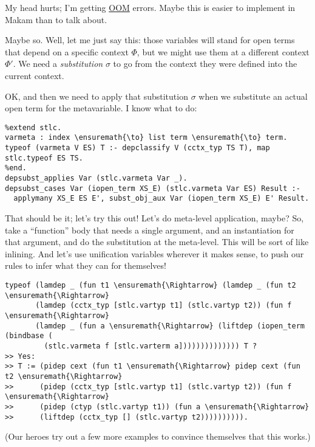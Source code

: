 \heroSTUDENT{} My head hurts; I'm getting
\href{https://en.wikipedia.org/wiki/Out_of_memory}{OOM} errors. Maybe
this is easier to implement in Makam than to talk about.

\heroADVISOR{} Maybe so. Well, let me just say this: those variables will
stand for open terms that depend on a specific context \(\Phi\), but we
might use them at a different context \(\Phi'\). We need a
\emph{substitution} \(\sigma\) to go from the context they were defined
into the current context.

\heroSTUDENT{} OK, and then we need to apply that substitution \(\sigma\) when
we substitute an actual open term for the metavariable. I know what to
do:

\vspace{-0.5em}

\begin{verbatim}
%extend stlc.
varmeta : index \ensuremath{\to} list term \ensuremath{\to} term.
typeof (varmeta V ES) T :- depclassify V (cctx_typ TS T), map stlc.typeof ES TS.
%end.
depsubst_applies Var (stlc.varmeta Var _).
depsubst_cases Var (iopen_term XS_E) (stlc.varmeta Var ES) Result :-
  applymany XS_E ES E', subst_obj_aux Var (iopen_term XS_E) E' Result.
\end{verbatim}

\heroADVISOR{} That should be it; let's try this out! Let's do meta-level
application, maybe? So, take a ``function'' body that needs a single
argument, and an instantiation for that argument, and do the
substitution at the meta-level. This will be sort of like inlining. And
let's use unification variables wherever it makes sense, to push our
rules to infer what they can for themselves!

\begin{verbatim}
typeof (lamdep _ (fun t1 \ensuremath{\Rightarrow} (lamdep _ (fun t2 \ensuremath{\Rightarrow}
       (lamdep (cctx_typ [stlc.vartyp t1] (stlc.vartyp t2)) (fun f \ensuremath{\Rightarrow}
       (lamdep _ (fun a \ensuremath{\Rightarrow} (liftdep (iopen_term (bindbase (
         (stlc.varmeta f [stlc.varterm a]))))))))))))) T ?
>> Yes:
>> T := (pidep cext (fun t1 \ensuremath{\Rightarrow} pidep cext (fun t2 \ensuremath{\Rightarrow}
>>      (pidep (cctx_typ [stlc.vartyp t1] (stlc.vartyp t2)) (fun f \ensuremath{\Rightarrow}
>>      (pidep (ctyp (stlc.vartyp t1)) (fun a \ensuremath{\Rightarrow}
>>      (liftdep (cctx_typ [] (stlc.vartyp t2)))))))))).
\end{verbatim}

\begin{scenecomment}
(Our heroes try out a few more examples to convince themselves that this works.)
\end{scenecomment}


